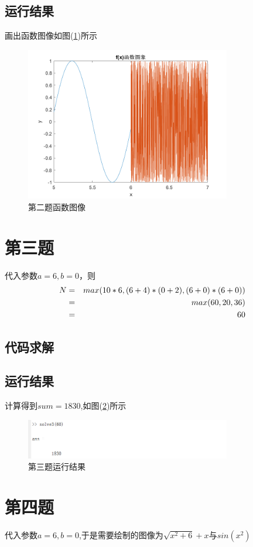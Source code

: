 \documentclass[a4paper,left=2.5cm,right=2.5cm]{article}
\begin{document}
\begin{spacing}{1.6}
	\subsection{运行结果}
	画出函数图像如图(\ref{sol2})所示
	\begin{figure}[H]
		\includegraphics[width=0.8\textwidth]{image/result_2.png}
		\caption{第二题函数图像}
		\label{sol2}
	\end{figure}
	\section{第三题}
	代入参数$a=6,b=0$，则
	\begin{eqnarray}
	N &=& max(10*6,(6+4)*(0+2),(6+0)*(6+0))\\
	& =& max(60,20,36)\notag\\
	& = & 60\notag
	\end{eqnarray}
	\subsection{代码求解}
	
	\subsection{运行结果}
	计算得到$sum=1830$,如图(\ref{sol3})所示
	\begin{figure}[H]
		\includegraphics[width=0.8\textwidth]{image/result_3.png}
		\caption{第三题运行结果}
		\label{sol3}
	\end{figure}
	\section{第四题}
	代入参数$a=6,b=0$,于是需要绘制的图像为$\sqrt{x^2+6}+x$与$sin(x^2)$

\end{spacing}
\end{document}
